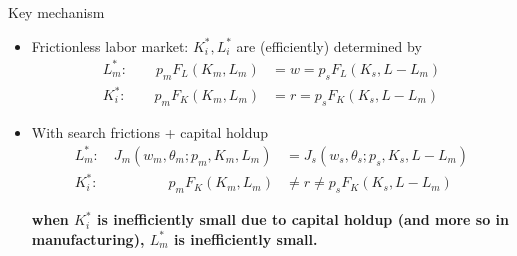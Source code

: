 \documentclass[9pt,xcolor={svgnames}]{beamer}
\begin{document}
\begin{frame}{Key mechanism}


\begin{itemize}
    \item Frictionless labor market:    $K^*_i, L^*_i$ are (efficiently) determined by
    \begin{align*}
 L^*_m:  \quad \quad  p_m   F_L(K_m, L_m) &= w = p_sF_L(K_s, L-L_m)   \\
  K^*_i: \quad  \quad    p_m F_K(K_m, L_m) & =r = p_sF_K(K_s, L-L_m)  
    \end{align*}

\item With search frictions + capital holdup
\begin{align*}
 L^*_m:  \quad     J_m(w_m, \theta_m ; p_m, K_m, L_m) & = J_s(w_s, \theta_s; p_s, K_s, L-L_m)  \\
  K^*_i: \quad  \quad   \quad \quad \quad    p_m F_K(K_m, L_m) & \neq r \neq p_sF_K(K_s, L-L_m)  
\end{align*}



\textbf{when $K^*_i$ is inefficiently small due to capital holdup (and more so in manufacturing), $L^*_m$ is inefficiently small.}
    
\end{itemize}
    
\end{frame}
\end{document}
